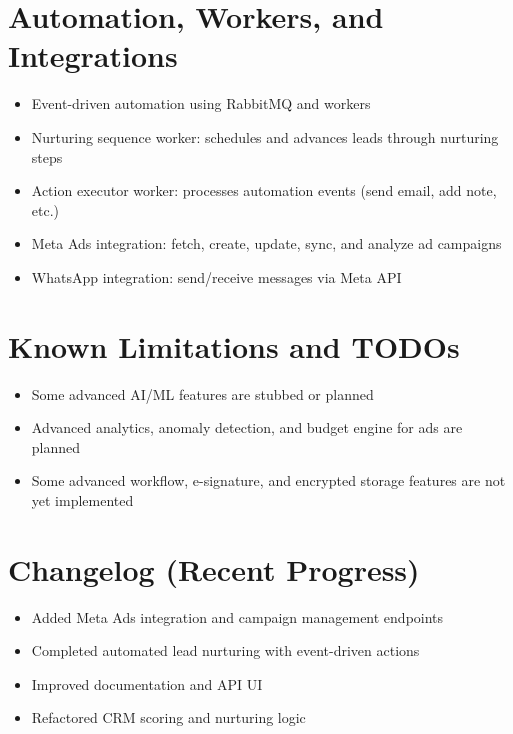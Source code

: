 \documentclass[11pt,a4paper]{article}
\begin{document}
\section{Automation, Workers, and Integrations}
\begin{itemize}
  \item Event-driven automation using RabbitMQ and workers
  \item Nurturing sequence worker: schedules and advances leads through nurturing steps
  \item Action executor worker: processes automation events (send email, add note, etc.)
  \item Meta Ads integration: fetch, create, update, sync, and analyze ad campaigns
  \item WhatsApp integration: send/receive messages via Meta API
\end{itemize}

\section{Known Limitations and TODOs}
\begin{itemize}
  \item Some advanced AI/ML features are stubbed or planned
  \item Advanced analytics, anomaly detection, and budget engine for ads are planned
  \item Some advanced workflow, e-signature, and encrypted storage features are not yet implemented
\end{itemize}

\section{Changelog (Recent Progress)}
\begin{itemize}
  \item Added Meta Ads integration and campaign management endpoints
  \item Completed automated lead nurturing with event-driven actions
  \item Improved documentation and API UI
  \item Refactored CRM scoring and nurturing logic
\end{itemize}
\end{document}
